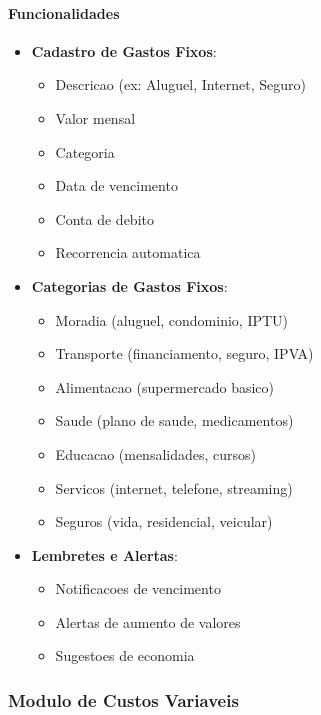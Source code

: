 \paragraph{Funcionalidades}
\begin{itemize}
    \item \textbf{Cadastro de Gastos Fixos}:
    \begin{itemize}
        \item Descricao (ex: Aluguel, Internet, Seguro)
        \item Valor mensal
        \item Categoria
        \item Data de vencimento
        \item Conta de debito
        \item Recorrencia automatica
    \end{itemize}
    
    \item \textbf{Categorias de Gastos Fixos}:
    \begin{itemize}
        \item Moradia (aluguel, condominio, IPTU)
        \item Transporte (financiamento, seguro, IPVA)
        \item Alimentacao (supermercado basico)
        \item Saude (plano de saude, medicamentos)
        \item Educacao (mensalidades, cursos)
        \item Servicos (internet, telefone, streaming)
        \item Seguros (vida, residencial, veicular)
    \end{itemize}
    
    \item \textbf{Lembretes e Alertas}:
    \begin{itemize}
        \item Notificacoes de vencimento
        \item Alertas de aumento de valores
        \item Sugestoes de economia
    \end{itemize}
\end{itemize}

\subsubsection{Modulo de Custos Variaveis}


